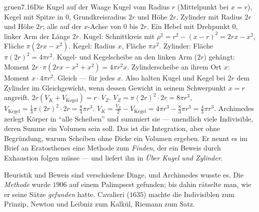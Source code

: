 \begin{loesungkarte}{gruen}{7.16}{Die Kugel auf der Waage}
Kugel vom Radius $r$ (Mittelpunkt bei $x = r$), Kegel mit Spitze in $0$, Grundkreisradius $2r$ und Höhe $2r$, Zylinder mit Radius $2r$ und Höhe $2r$; alle auf der $x$-Achse von $0$ bis $2r$. Ein Hebel mit Drehpunkt $0$, linker Arm der Länge $2r$.
Kugel: Schnittkreis mit $\rho^{2} = r^{2} - (x - r)^{2} = 2rx - x^{2}$, Fläche $\pi(2rx - x^{2})$. Kegel: Radius $x$, Fläche $\pi x^{2}$. Zylinder: Fläche $\pi(2r)^{2} = 4\pi r^{2}$.
Kugel- und Kegelscheibe an den linken Arm ($2r$) gehängt: Moment $2r\cdot\pi(2rx - x^{2} + x^{2}) = 4\pi r^{2}x$. Zylinderscheibe an ihrem Ort $x$: Moment $x\cdot4\pi r^{2}$. Gleich --- für jedes $x$. Also halten Kugel und Kegel bei $2r$ dem Zylinder im Gleichgewicht, wenn dessen Gewicht in seinem Schwerpunkt $x = r$ angreift.
$2r(V_K + V_{\text{Kegel}}) = r\cdot V_Z$. $V_Z = \pi(2r)^{2}\cdot2r = 8\pi r^{3}$, $V_{\text{Kegel}} = \frac13\pi(2r)^{2}\cdot2r = \frac83\pi r^{3}$. $V_K = \frac{V_Z}2 - V_{\text{Kegel}} = 4\pi r^{3} - \frac83\pi r^{3} = \frac43\pi r^{3}$.
Archimedes zerlegt Körper in \enquote{alle Scheiben} und summiert sie --- unendlich viele Indivisible, deren Summe ein Volumen sein soll. Das ist die Integration, aber ohne Begründung, warum Scheiben ohne Dicke ein Volumen ergeben. Er nennt es im Brief an Eratosthenes eine Methode zum \emph{Finden}, der ein Beweis durch Exhaustion folgen müsse --- und liefert ihn in \emph{Über Kugel und Zylinder}.
\begin{mitnehmen}\kastentext
Heuristik und Beweis sind verschiedene Dinge, und Archimedes wusste es. Die \emph{Methode} wurde $1906$ auf einem Palimpsest gefunden; bis dahin rätselte man, wie er seine Sätze \emph{gefunden} hatte. Cavalieri ($1635$) machte die Indivisiblen zum Prinzip, Newton und Leibniz zum Kalkül, Riemann zum Satz.
\end{mitnehmen}
\end{loesungkarte}

